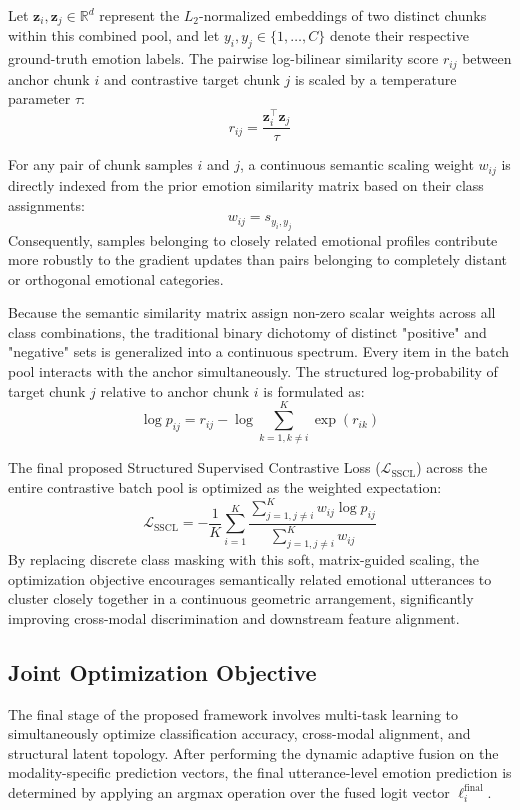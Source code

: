 {Let $\mathbf{z}_i, \mathbf{z}_j \in \mathbb{R}^d$ represent the $L_2$-normalized embeddings of two distinct chunks within this combined pool, and let $y_i, y_j \in \{1, \dots, C\}$ denote their respective ground-truth emotion labels. The pairwise log-bilinear similarity score $r_{ij}$ between anchor chunk $i$ and contrastive target chunk $j$ is scaled by a temperature parameter $\tau$:
\begin{equation}
	r_{ij} = \frac{\mathbf{z}_i^{\top} \mathbf{z}_j}{\tau}
\end{equation}

For any pair of chunk samples $i$ and $j$, a continuous semantic scaling weight $w_{ij}$ is directly indexed from the prior emotion similarity matrix based on their class assignments:
\begin{equation}
	w_{ij} = s_{y_i, y_j}
\end{equation}
Consequently, samples belonging to closely related emotional profiles contribute more robustly to the gradient updates than pairs belonging to completely distant or orthogonal emotional categories.

Because the semantic similarity matrix assign non-zero scalar weights across all class combinations, the traditional binary dichotomy of distinct "positive" and "negative" sets is generalized into a continuous spectrum. Every item in the batch pool interacts with the anchor simultaneously. The structured log-probability of target chunk $j$ relative to anchor chunk $i$ is formulated as:
\begin{equation}
	\log p_{ij} = r_{ij} - \log \sum_{k=1, k \neq i}^{K} \exp(r_{ik})
\end{equation}

The final proposed Structured Supervised Contrastive Loss ($\mathcal{L}_{\text{SSCL}}$) across the entire contrastive batch pool is optimized as the weighted expectation:
\begin{equation}
	\mathcal{L}_{\text{SSCL}} = -\frac{1}{K} \sum_{i=1}^{K} \frac{\sum_{j=1, j \neq i}^{K} w_{ij} \log p_{ij}}{\sum_{j=1, j \neq i}^{K} w_{ij}}
\end{equation}
By replacing discrete class masking with this soft, matrix-guided scaling, the optimization objective encourages semantically related emotional utterances to cluster closely together in a continuous geometric arrangement, significantly improving cross-modal discrimination and downstream feature alignment.

\subsection{Joint Optimization Objective}
The final stage of the proposed framework involves multi-task learning to simultaneously optimize classification accuracy, cross-modal alignment, and structural latent topology. After performing the dynamic adaptive fusion on the modality-specific prediction vectors, the final utterance-level emotion prediction is determined by applying an argmax operation over the fused logit vector $\mathbf{\ell}_i^{\text{final}}$. 

}
